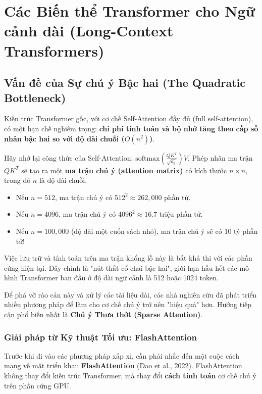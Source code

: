 
\section{Các Biến thể Transformer cho Ngữ cảnh dài (Long-Context Transformers)}
\label{sec:long_context_transformers}

\subsection{Vấn đề của Sự chú ý Bậc hai (The Quadratic Bottleneck)}
\label{ssec:quadratic_bottleneck}

Kiến trúc Transformer gốc, với cơ chế Self-Attention đầy đủ (full self-attention), có một hạn chế nghiêm trọng: \textbf{chi phí tính toán và bộ nhớ tăng theo cấp số nhân bậc hai so với độ dài chuỗi ($O(n^2)$)}.

Hãy nhớ lại công thức của Self-Attention: $\text{softmax}\left(\frac{QK^T}{\sqrt{d_k}}\right)V$. Phép nhân ma trận $QK^T$ sẽ tạo ra một \textbf{ma trận chú ý (attention matrix)} có kích thước $n \times n$, trong đó $n$ là độ dài chuỗi.
\begin{itemize}
    \item Nếu $n = 512$, ma trận chú ý có $512^2 \approx 262,000$ phần tử.
    \item Nếu $n = 4096$, ma trận chú ý có $4096^2 \approx 16.7$ triệu phần tử.
    \item Nếu $n = 100,000$ (độ dài một cuốn sách nhỏ), ma trận chú ý sẽ có $10$ tỷ phần tử!
\end{itemize}
Việc lưu trữ và tính toán trên ma trận khổng lồ này là bất khả thi với các phần cứng hiện tại. Đây chính là "nút thắt cổ chai bậc hai", giới hạn hầu hết các mô hình Transformer ban đầu ở độ dài ngữ cảnh là 512 hoặc 1024 token.

Để phá vỡ rào cản này và xử lý các tài liệu dài, các nhà nghiên cứu đã phát triển nhiều phương pháp để làm cho cơ chế chú ý trở nên "hiệu quả" hơn. Hướng tiếp cận phổ biến nhất là \textbf{Chú ý Thưa thớt (Sparse Attention)}.
\subsubsection{Giải pháp từ Kỹ thuật Tối ưu: FlashAttention}
Trước khi đi vào các phương pháp xấp xỉ, cần phải nhắc đến một cuộc cách mạng về mặt triển khai: \textbf{FlashAttention} (Dao et al., 2022)\cite{dao2022flashattention}. FlashAttention không thay đổi kiến trúc Transformer, mà thay đổi \textbf{cách tính toán} cơ chế chú ý trên phần cứng GPU.

